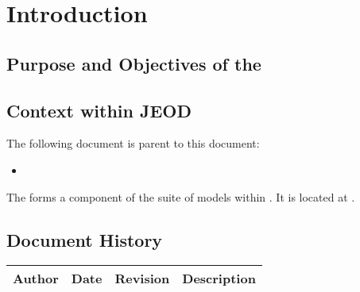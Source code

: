 %
%
%
%
%

\chapter{Introduction}
\label{ch:intro}


\section{Purpose and Objectives of the \MODELTITLE}



\section{Context within JEOD}
The following document is parent to this document:
\begin{itemize}
\item \hyperJEOD
\end{itemize}

The \MODELTITLEx forms a component of the \MODELGROUPx suite of
models within \JEODid. It is located at \MODELPATH.


\section{Document History}
\begin{tabular}{||l|l|l|l|} \hline
{\bf Author } & {\bf Date} & {\bf Revision} & {\bf Description} \\ \hline \hline

\end{tabular}


